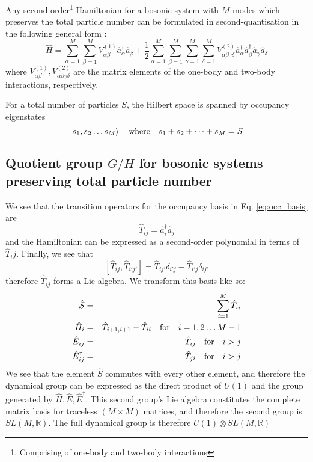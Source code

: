 \documentclass[12pt]{article}
\begin{document}
	Any second-order\footnote{Comprising of one-body and two-body interactions} Hamiltonian for a bosonic system with $M$ modes which preserves the total particle number can be formulated in second-quantisation in the following general form \cite[p. 3]{green}:
	\begin{equation}\label{eq:general hamiltonian}
	\hat{H} = \sum_{\alpha=1}^M\sum_{\beta=1}^M V^{(1)}_{\alpha\beta}\hat{a}^\dagger_\alpha\hat{a}_\beta + \frac{1}{2}\sum_{\alpha=1}^M\sum_{\beta=1}^M\sum_{\gamma=1}^M\sum_{\delta=1}^M V^{(2)}_{\alpha\beta\gamma\delta}\hat{a}^\dagger_\alpha\hat{a}^\dagger_\beta\hat{a}_\gamma\hat{a}_\delta
	\end{equation}
	where $V^{(1)}_{\alpha\beta}, V^{(2)}_{\alpha\beta\gamma\delta}$ are the matrix elements of the one-body and two-body interactions, respectively.
	
	For a total number of particles $S$, the Hilbert space is spanned by occupancy eigenstates
	\begin{equation}\label{eq:occ_basis}
	\ket{s_1,s_2\dots s_M}\qq{where} s_1+s_2+\dots + s_M = S
	\end{equation}
	
	\subsection{Quotient group $G/H$ for bosonic systems preserving total particle number}
	
	We see that the transition operators for the occupancy basis in Eq. \ref{eq:occ_basis} are
	\begin{equation}
		\hat{T}_{ij}=\hat{a}^\dagger_i\hat{a}_j
	\end{equation}
	and the Hamiltonian can be expressed as a second-order polynomial in terms of $\hat{T}_ij$. Finally, we see that
	\begin{equation}
	\left[\hat{T}_{ij}, \hat{T}_{i'j'}\right]=\hat{T}_{ij'}\delta_{i'j}-\hat{T}_{i'j}\delta_{ij'}
	\end{equation}
	therefore $\hat{T}_{ij}$ forms a Lie algebra. We transform this basis like so:
	\begin{eqnarray*}
	\hat{S}&=&\sum_{i=1}^M\hat{T}_{ii}\\
	\hat{H}_i&=&\hat{T}_{i+1,i+1}-\hat{T}_{ii}\qq{for}i=1,2\dots M-1\\
	\hat{E}_{ij}&=&\hat{T}_{ij}\qq{for}i>j\\
	\hat{E}_{ij}^\dagger &=&\hat{T}_{ji}\qq{for}i>j
	\end{eqnarray*}
	We see that the element $\hat{S}$ commutes with every other element, and therefore the dynamical group can be expressed as the direct product of $U(1)$ and the group generated by $\hat{H},\hat{E},\hat{E}^\dagger$. This second group's Lie algebra constitutes the complete matrix basis for traceless $(M\times M)$ matrices, and therefore the second group is $SL(M,\mathbb{R})$. The full dynamical group is therefore $U(1)\otimes SL(M,\mathbb{R})$
	
\end{document}
